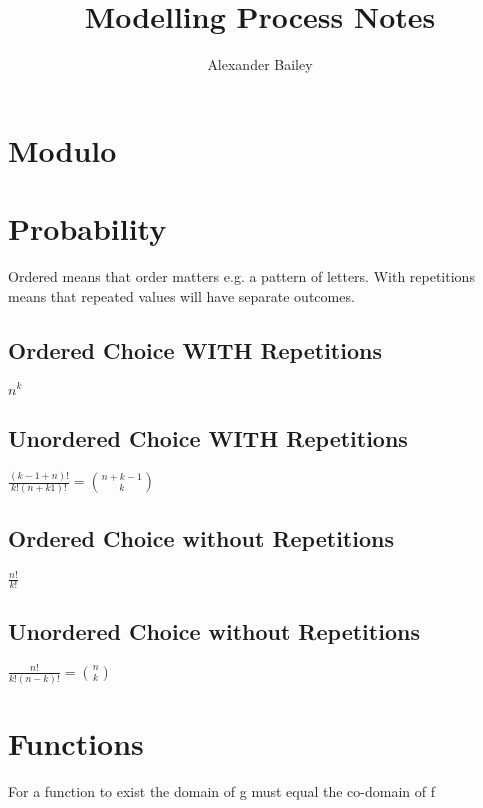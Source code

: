 \documentclass[12pt] {article}
\begin{document}
\title{Modelling Process Notes}
\author{Alexander Bailey}
\maketitle

\section*{Modulo}

\section*{Probability}
Ordered means that order matters e.g. a pattern of letters. With repetitions means that repeated values will have 
separate outcomes. 
\subsection*{Ordered Choice WITH Repetitions}
$n^k$
\subsection*{Unordered Choice WITH Repetitions}
$\frac{(k-1+n)!}{k!(n+k1)!} = {n + k -1 \choose k}$ 
\subsection*{Ordered Choice without Repetitions}
$\frac{n!}{k!}$
\subsection*{Unordered Choice without Repetitions}
$\frac{n!}{k!(n-k)!} = {n \choose k}$

\section*{Functions}
For a function to exist the domain of g must equal the co-domain of f
\end{document}
